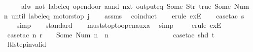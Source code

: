 \begin{isabellebody}
\ \ \ \ \ {\isachardoublequoteopen}alw\ {\isacharparenleft}{\isacharparenleft}not\ {\isacharparenleft}label{\isacharunderscore}eq\ {\isacharprime}{\isacharprime}opendoor{\isacharprime}{\isacharprime}\ aand\ nxt\ {\isacharparenleft}output{\isacharunderscore}eq\ {\isacharbrackleft}Some\ {\isacharparenleft}Str\ {\isacharprime}{\isacharprime}true{\isacharprime}{\isacharprime}{\isacharparenright}{\isacharcomma}\ Some\ {\isacharparenleft}Num\ n{\isacharparenright}{\isacharbrackright}{\isacharparenright}{\isacharparenright}{\isacharparenright}\ until\ {\isacharparenleft}label{\isacharunderscore}eq\ {\isacharprime}{\isacharprime}motorstop{\isacharprime}{\isacharprime}{\isacharparenright}{\isacharparenright}\ j{\isachardoublequoteclose}\isanewline
%
\isadelimproof
\ \ %
\endisadelimproof
%
\isatagproof
{}\isamarkupfalse%
\ assms\ \isamarkupfalse%
\ coinduct\isanewline
\isanewline
\ \ \isamarkupfalse%
\ {\isacharparenleft}erule\ exE{\isacharparenright}\isanewline
\ \ \isamarkupfalse%
\ {\isacharparenleft}case{\isacharunderscore}tac\ {\isachardoublequoteopen}s{\isacharequal}{}{\isachardoublequoteclose}{\isacharparenright}\isanewline
\isanewline
\ \ \isamarkupfalse%
\ simp\isanewline
\ \ \isamarkupfalse%
\ standard\isanewline
\ \ \isamarkupfalse%
\ must{\isacharunderscore}stop{\isacharunderscore}to{\isacharunderscore}open{\isacharunderscore}aux{}a\ \isamarkupfalse%
\ simp\isanewline
\ \ \ \isamarkupfalse%
\ {\isacharparenleft}erule\ exE{\isacharparenright}{\isacharplus}\isanewline
\ \ \ \ \isamarkupfalse%
\ {\isacharparenleft}case{\isacharunderscore}tac\ {\isachardoublequoteopen}{\isasymexists}n{\isachardot}\ r\ {\isachardollar}\ {}\ {\isacharequal}\ Some\ {\isacharparenleft}Num\ n{\isacharparenright}\ {\isasymand}\ n\ {\isasymin}\ {\isacharbraceleft}{}{\isacharcomma}\ {}{\isacharcomma}\ {}{\isacharcomma}\ {}{\isacharbraceright}{\isachardoublequoteclose}{\isacharparenright}\isanewline
\ \ \ \ \isamarkupfalse%
\ {}\isanewline
\ \ \ \ \ \isamarkupfalse%
\ {\isacharparenleft}case{\isacharunderscore}tac\ {\isachardoublequoteopen}shd\ t{\isachardoublequoteclose}{\isacharparenright}\isanewline
\ \ \isamarkupfalse%
\ ltl{\isacharunderscore}step{\isacharunderscore}{}{\isacharunderscore}invalid\ \isamarkupfalse%

\end{isabellebody}
